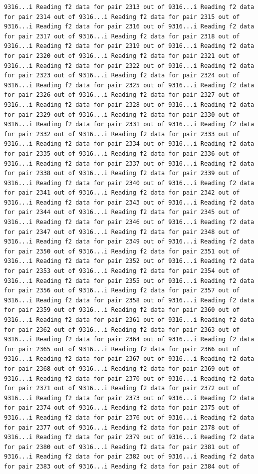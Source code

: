 \documentclass[
]{article}
\begin{document}
\begin{verbatim}
9316...i Reading f2 data for pair 2313 out of 9316...i Reading f2 data for pair 2314 out of 9316...i Reading f2 data for pair 2315 out of 9316...i Reading f2 data for pair 2316 out of 9316...i Reading f2 data for pair 2317 out of 9316...i Reading f2 data for pair 2318 out of 9316...i Reading f2 data for pair 2319 out of 9316...i Reading f2 data for pair 2320 out of 9316...i Reading f2 data for pair 2321 out of 9316...i Reading f2 data for pair 2322 out of 9316...i Reading f2 data for pair 2323 out of 9316...i Reading f2 data for pair 2324 out of 9316...i Reading f2 data for pair 2325 out of 9316...i Reading f2 data for pair 2326 out of 9316...i Reading f2 data for pair 2327 out of 9316...i Reading f2 data for pair 2328 out of 9316...i Reading f2 data for pair 2329 out of 9316...i Reading f2 data for pair 2330 out of 9316...i Reading f2 data for pair 2331 out of 9316...i Reading f2 data for pair 2332 out of 9316...i Reading f2 data for pair 2333 out of 9316...i Reading f2 data for pair 2334 out of 9316...i Reading f2 data for pair 2335 out of 9316...i Reading f2 data for pair 2336 out of 9316...i Reading f2 data for pair 2337 out of 9316...i Reading f2 data for pair 2338 out of 9316...i Reading f2 data for pair 2339 out of 9316...i Reading f2 data for pair 2340 out of 9316...i Reading f2 data for pair 2341 out of 9316...i Reading f2 data for pair 2342 out of 9316...i Reading f2 data for pair 2343 out of 9316...i Reading f2 data for pair 2344 out of 9316...i Reading f2 data for pair 2345 out of 9316...i Reading f2 data for pair 2346 out of 9316...i Reading f2 data for pair 2347 out of 9316...i Reading f2 data for pair 2348 out of 9316...i Reading f2 data for pair 2349 out of 9316...i Reading f2 data for pair 2350 out of 9316...i Reading f2 data for pair 2351 out of 9316...i Reading f2 data for pair 2352 out of 9316...i Reading f2 data for pair 2353 out of 9316...i Reading f2 data for pair 2354 out of 9316...i Reading f2 data for pair 2355 out of 9316...i Reading f2 data for pair 2356 out of 9316...i Reading f2 data for pair 2357 out of 9316...i Reading f2 data for pair 2358 out of 9316...i Reading f2 data for pair 2359 out of 9316...i Reading f2 data for pair 2360 out of 9316...i Reading f2 data for pair 2361 out of 9316...i Reading f2 data for pair 2362 out of 9316...i Reading f2 data for pair 2363 out of 9316...i Reading f2 data for pair 2364 out of 9316...i Reading f2 data for pair 2365 out of 9316...i Reading f2 data for pair 2366 out of 9316...i Reading f2 data for pair 2367 out of 9316...i Reading f2 data for pair 2368 out of 9316...i Reading f2 data for pair 2369 out of 9316...i Reading f2 data for pair 2370 out of 9316...i Reading f2 data for pair 2371 out of 9316...i Reading f2 data for pair 2372 out of 9316...i Reading f2 data for pair 2373 out of 9316...i Reading f2 data for pair 2374 out of 9316...i Reading f2 data for pair 2375 out of 9316...i Reading f2 data for pair 2376 out of 9316...i Reading f2 data for pair 2377 out of 9316...i Reading f2 data for pair 2378 out of 9316...i Reading f2 data for pair 2379 out of 9316...i Reading f2 data for pair 2380 out of 9316...i Reading f2 data for pair 2381 out of 9316...i Reading f2 data for pair 2382 out of 9316...i Reading f2 data for pair 2383 out of 9316...i Reading f2 data for pair 2384 out of 
\end{verbatim}
\end{document}
